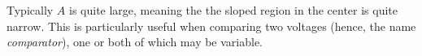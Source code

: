{\begin{center}
\end{center}

Typically $A$ is quite large, meaning the the sloped region in the center is quite narrow. This is particularly useful when comparing two voltages (hence, the name \textit{comparator}), one or both of which may be variable.
}